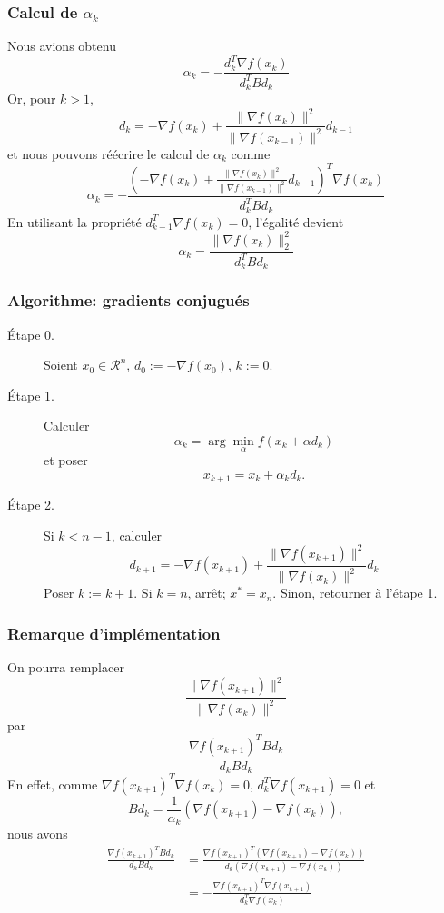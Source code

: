 \documentclass[usepdftitle=false,aspectratio=169]{beamer}
\def\cR{\mathcal{R}}
\begin{document}
\begin{frame}
\frametitle{Calcul de $\alpha_k$}

Nous avions obtenu
$$
\alpha_k = -\frac{d_k^T \nabla f(x_k)}{d_k^T B d_k}
$$
Or, pour $k > 1$,
$$
d_k = -\nabla f(x_{k}) + \frac{\| \nabla f(x_{k}) \|^2}{\| \nabla f(x_{k-1}) \|^2} d_{k-1}
$$
et nous pouvons réécrire le calcul de $\alpha_k$ comme
$$
\alpha_k = -\frac{(-\nabla f(x_{k}) + \frac{\| \nabla f(x_{k}) \|^2}{\| \nabla f(x_{k-1}) \|^2} d_{k-1})^T \nabla f(x_k)}{d_k^T B d_k}
$$
En utilisant la propriété $d_{k-1}^T \nabla f(x_k) = 0$, l'égalité devient 
$$
\alpha_k = \frac{\| \nabla f(x_k) \|_2^2}{d_k^T B d_k}
$$

\end{frame}

\begin{frame}
\frametitle{Algorithme: gradients conjugués}

\begin{description}
\item[Étape 0.]
Soient $x_0 \in \cR^n$, $d_0 := -\nabla f(x_0)$, $k := 0$.
\item[Étape 1.]
Calculer
$$
\alpha_k = \arg \min_{\alpha} f(x_k + \alpha d_k)
$$
et poser
$$
x_{k+1} = x_k + \alpha_k d_k.
$$
\item[Étape 2.]
Si $k < n-1$, calculer
$$
d_{k+1} = -\nabla f(x_{k+1}) + \frac{\| \nabla f(x_{k+1}) \|^2}{\| \nabla f(x_k) \|^2} d_k
$$
Poser $k := k+1$. Si $k = n$, arrêt; $x^* = x_n$. Sinon, retourner à l'étape 1.
\end{description}

\end{frame}

\begin{frame}
\frametitle{Remarque d'implémentation}

On pourra remplacer
$$
\frac{\| \nabla f(x_{k+1}) \|^2}{\| \nabla f(x_k) \|^2}
$$
par
$$
\frac{\nabla f(x_{k+1})^T B d_k}{d_k B d_k}
$$
En effet, comme
$\nabla f(x_{k+1})^T \nabla f(x_k) = 0$, $d_k^T \nabla f(x_{k+1}) = 0$ et
$$
B d_k = \frac{1}{\alpha_k} (\nabla f(x_{k+1}) - \nabla f(x_k)),
$$
nous avons
\begin{align*}
\frac{\nabla f(x_{k+1})^T B d_k}{d_k B d_k}
&= \frac{\nabla f(x_{k+1})^T (\nabla f(x_{k+1}) - \nabla f(x_k))}{d_k (\nabla f(x_{k+1}) - \nabla f(x_k))} \\
&= -\frac{\nabla f(x_{k+1})^T \nabla f(x_{k+1})}{d_k^T \nabla f(x_k)} \\
\end{align*}

\end{frame}
\end{document}
